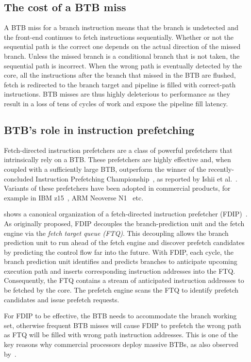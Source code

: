 \subsection{The cost of a BTB miss}
A BTB miss for a branch instruction means that the branch is undetected and the front-end continues to fetch instructions sequentially. Whether or not the sequential path is the correct one depends on the actual direction of the missed branch. Unless the missed branch is a conditional branch that is not taken, the sequential path is incorrect. When the wrong path is eventually detected by the core, all the instructions after the branch that missed in the BTB are flushed, fetch is redirected to the branch target and pipeline is filled with correct-path instructions. BTB misses are thus highly deleterious to performance as they result in a loss of tens of cycles of work and expose the pipeline fill latency. 


\subsection{BTB's role in instruction prefetching}
Fetch-directed instruction prefetchers are a class of powerful  prefetchers that intrinsically rely on a BTB. 
These prefetchers are highly effective and, when coupled with a sufficiently large BTB, outperform the winner of the recently-concluded Instruction Prefetching Championship~\cite{ipc1}, as reported by Ishii et al.~\cite{rebase}. Variants of these prefetchers have been adopted in commercial products, for example in IBM z15~\cite{IBMz15HotChips}, ARM Neoverse N1~\cite{neoverse} etc.

 shows a canonical organization of a fetch-directed instruction prefetcher (FDIP)~\cite{fdip}. 
As originally proposed, FDIP decouples the branch-prediction unit and the fetch engine via the {\em fetch target queue (FTQ)}. This decoupling allows the branch prediction unit to run ahead of the fetch engine and discover prefetch candidates by predicting the control flow far into the future. With FDIP, each cycle, the branch prediction unit identifies and predicts branches to anticipate upcoming execution path and inserts corresponding instruction addresses into the FTQ. Consequently, the FTQ contains a stream of anticipated instruction addresses to be fetched by the core. The prefetch engine scans the FTQ to identify prefetch candidates and issue prefetch requests.

For FDIP to be effective, the BTB needs to accommodate the branch working set, otherwise frequent BTB misses will cause FDIP to prefetch the wrong path as FTQ will be filled with wrong path instruction addresses. This is one of the key reasons why commercial processors deploy massive BTBs, as also observed by~\cite{rebase}.



